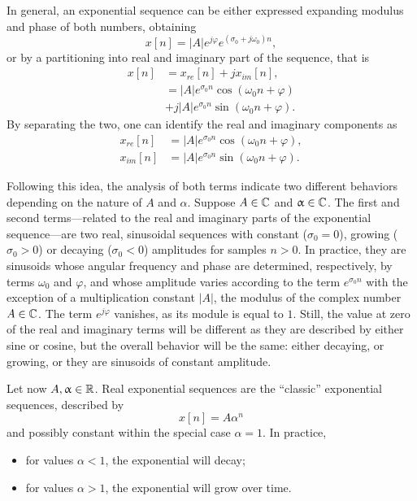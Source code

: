 \documentclass[\documentfontsize, twocolumn]{\classname}
\begin{document}
In general, an exponential se\-quen\-ce can be either expressed expanding modulus and phase of both numbers, obtaining \[x[n] = |A|e^{j\varphi}e^{(\sigma_0 + j\omega_0)n},\] or by a partitioning into real and imaginary part of the se\-quen\-ce, that is 
\begin{align*}
    x[n] &= x_{re}[n] + jx_{im}[n],\\
         &= |A|e^{\sigma_0n}\cos{(\omega_0 n + \varphi)} \\
         &+ j|A|e^{\sigma_0n}\sin{(\omega_0 n + \varphi)}.
\end{align*}
By separating the two, one can identify the real and imaginary components as
\begin{align}
    x_{re}[n] & = |A|e^{\sigma_0n}\cos{(\omega_0 n + \varphi)},\\
    x_{im}[n] & = |A|e^{\sigma_0n}\sin{(\omega_0 n + \varphi)}.
\end{align}

Following this idea, the analysis of both terms indicate two different behaviors depending on the nature of $A$ and $\alpha$. Suppose $A \in \mathbb C$ and $\upalpha \in \mathbb C$. The first and second terms---related to the real and imaginary parts of the exponential se\-quen\-ce---are two real, sinusoidal se\-quen\-ces with constant ($\sigma_0 = 0$), growing ($\sigma_0 > 0$) or decaying ($\sigma_0 < 0$) amplitudes for samples $n > 0$. In practice, they are sinusoids whose angular frequency and phase are determined, respectively, by terms $\omega_0$ and $\varphi$, and whose amplitude varies according to the term $e^{\sigma_0n}$ with the exception of a multiplication constant $|A|$, the modulus of the complex number $A \in \mathbb C$. The term $e^{j\varphi}$ vanishes, as its module is equal to $1$. Still, the value at zero of the real and imaginary terms will be different as they are described by either sine or cosine, but the overall behavior will be the same: either decaying, or growing, or they are sinusoids of constant amplitude.

Let now $A,\upalpha \in \mathbb R$. Real exponential se\-quen\-ces are the ``classic'' exponential se\-quen\-ces, described by \[x[n] = A\alpha^n\] and possibly constant within the special case $\alpha=1$. In practice,
\begin{itemize}
    \item for values $\alpha < 1$, the exponential will decay;
    \item for values $\alpha > 1$, the exponential will grow over time.
\end{itemize}
\end{document}
